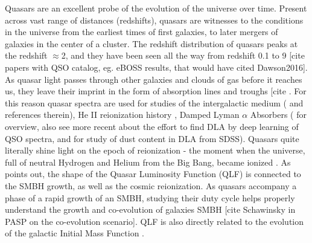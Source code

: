 \documentclass[modern]{aastex62}
\begin{document}

Quasars are an excellent probe of the evolution of the universe over time. Present across vast range of distances (redshifts), quasars are witnesses to the conditions in the universe from the earliest times of first galaxies, to later mergers of galaxies in the center  of a cluster.  The redshift distribution of quasars peaks at the redshift $\approx$2, and they have been seen all the way from redshift 0.1 to 9 [cite papers with QSO catalog, eg. eBOSS results, that would have cited Dawson2016]. As quasar light passes through other galaxies and clouds of gas before it reaches us, they leave their imprint  in the form of absorption lines and troughs [cite .  For this reason quasar spectra are used  for studies of the intergalactic medium (\cite{prochaska2014} and references therein),  He II reionization history \citep{khrykin2017} , Damped Lyman $\alpha$ Absorbers (\cite{wolfe2005} for overview, also see more recent \cite{parks2018} about the effort to find DLA by deep learning of QSO spectra, and \cite{murphy2016} for study of  dust content in DLA from SDSS).  Quasars quite literally shine light on the epoch of reionization - the moment when the universe, full of neutral Hydrogen and Helium from the Big Bang, became ionized \citep{glikman2011, masters2012, ross2013}. As  \cite{alsayyad2016} points out, the shape of the Quasar Luminosity Function (QLF) is connected to the SMBH growth, as well as the cosmic reionization. As quasars accompany a phase of a rapid growth of an SMBH, studying their duty cycle helps properly understand the growth and co-evolution of  galaxies SMBH [cite Schawinsky in PASP on the co-evolution  scenario].  QLF is also directly related to the evolution of the galactic Initial Mass Function \citep{mcgreer2013}. 
\end{document}
